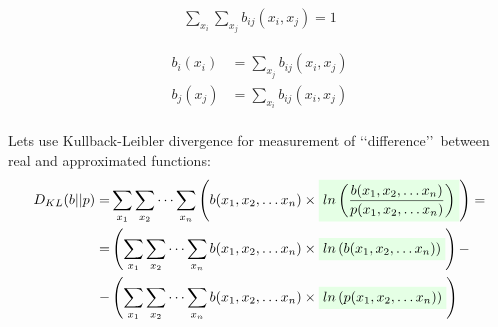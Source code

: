 \documentclass[fleqn,leqno]{article}
\newcommand{\highlight}[1]{\colorbox{green!10}{$\displaystyle#1$}}
\begin{document}
\begin{equation} \label{eq:sum_over_states_of_two_node_marginal_probabilities_b}
\begin{split}
\sum_{x_i} \sum_{x_j} b_{ij}(x_i, x_j) = 1
\end{split}
\end{equation}

\begin{equation} \label{eq:one_node_marginal_probabilities_from_two_node_marginal_probabilities_b}
\begin{split}
b_i(x_i) & = \sum_{x_j} b_{ij}(x_i, x_j) \\
b_j(x_j) & = \sum_{x_i} b_{ij}(x_i, x_j) \\
\end{split}
\end{equation}

Lets use Kullback-Leibler divergence for measurement of \lq \lq difference\rq \rq\ between real and approximated functions:
\begin{equation}
\begin{split}
D_{KL}(b||p) = & \sum_{x_1} \sum_{x_2} \cdots \sum_{x_n} \left( b(x_1, x_2, \dots x_n) \times \highlight{ ln \left( {b(x_1, x_2, \dots x_n) \over p(x_1, x_2, \dots x_n)} \right) } \right) = \\
            = & \left( \sum_{x_1} \sum_{x_2} \cdots \sum_{x_n} b(x_1, x_2, \dots x_n) \times \highlight{ ln \left( b(x_1, x_2, \dots x_n) \right) } \right) - \\
             - & \left( \sum_{x_1} \sum_{x_2} \cdots \sum_{x_n} b(x_1, x_2, \dots x_n) \times \highlight{ ln \left( p(x_1, x_2, \dots x_n) \right) } \right)
\end{split}
\end{equation}
\end{document}
